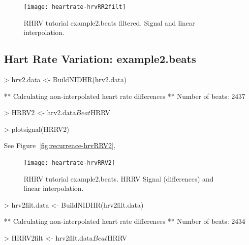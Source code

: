 \documentclass[a4paper, english, utf8]{amsart}
\newcommand{\figref}[1]{Figure\ \vref{#1}}
\begin{document}
\begin{figure}[htbp]
\begin{center}
\texttt{[image: heartrate-hrvRR2filt]}
\caption{RHRV tutorial example2.beats filtered. Signal and linear interpolation.}
\label{fig:recurrence-hrvRR2filt}
\end{center}
\end{figure}


\subsection{Hart Rate Variation: example2.beats}



\begin{Schunk}
\begin{Sinput}
> hrv2.data <- BuildNIDHR(hrv2.data)
\end{Sinput}
\begin{Soutput}
** Calculating non-interpolated heart rate differences **
   Number of beats: 2437 
\end{Soutput}
\begin{Sinput}
> HRRV2 <- hrv2.data$Beat$HRRV
\end{Sinput}
\end{Schunk}


\begin{Schunk}
\begin{Sinput}
> plotsignal(HRRV2)
\end{Sinput}
\end{Schunk}
See \figref{fig:recurrence-hrvRRV2},

\begin{figure}[htbp]
\begin{center}
\texttt{[image: heartrate-hrvRRV2]}
\caption{RHRV tutorial example2.beats. HRRV Signal (differences) and linear interpolation.}
\label{fig:recurrence-hrvRRV2}
\end{center}
\end{figure}

%
\begin{Schunk}
\begin{Sinput}
> hrv2filt.data <- BuildNIDHR(hrv2filt.data)
\end{Sinput}
\begin{Soutput}
** Calculating non-interpolated heart rate differences **
   Number of beats: 2434 
\end{Soutput}
\begin{Sinput}
> HRRV2filt <- hrv2filt.data$Beat$HRRV
\end{Sinput}
\end{Schunk}
\end{document}
